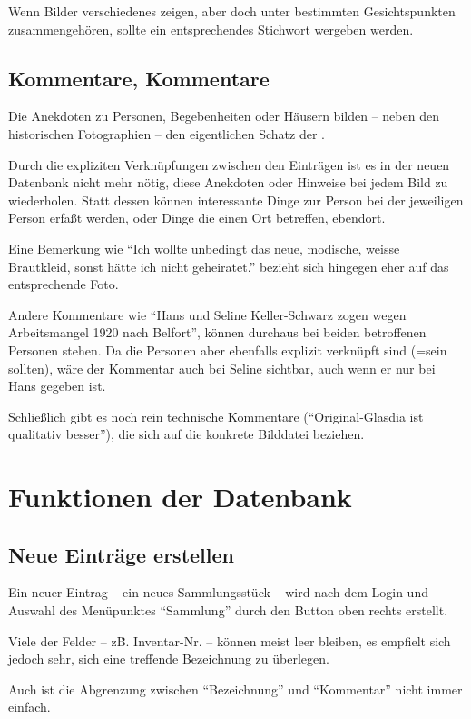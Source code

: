 \documentclass{scrartcl}
\begin{document}
Wenn Bilder verschiedenes zeigen, aber doch unter bestimmten
Gesichtspunkten zusammengehören, sollte ein entsprechendes Stichwort
wergeben werden.

\subsection{Kommentare, Kommentare}

Die Anekdoten zu Personen, Begebenheiten oder Häusern bilden -- neben
den historischen Fotographien -- den eigentlichen Schatz der \DB{}.

Durch die expliziten Verknüpfungen zwischen den Einträgen ist es
in der neuen Datenbank nicht mehr nötig, diese Anekdoten oder Hinweise
bei jedem Bild zu wiederholen. Statt dessen können interessante
Dinge zur Person bei der jeweiligen Person erfaßt werden, oder
Dinge die einen Ort betreffen, ebendort.

Eine Bemerkung wie ``Ich wollte unbedingt das neue, modische, weisse
Brautkleid, sonst hätte ich nicht geheiratet.'' bezieht sich hingegen
eher auf das entsprechende Foto.

Andere Kommentare wie ``Hans und Seline Keller-Schwarz zogen wegen
Arbeitsmangel 1920 nach Belfort'', können durchaus bei beiden
betroffenen Personen stehen. Da die Personen aber ebenfalls explizit
verknüpft sind (=sein sollten), wäre der Kommentar auch bei Seline
sichtbar, auch wenn er nur bei Hans gegeben ist.

Schließlich gibt es noch rein technische Kommentare
(``Original-Glasdia ist qualitativ besser''), die sich auf die
konkrete Bilddatei beziehen. 



\section{Funktionen der Datenbank}
\subsection{Neue Einträge erstellen}

Ein neuer Eintrag -- ein neues Sammlungsstück -- wird nach dem Login und
Auswahl des Menüpunktes ``Sammlung'' durch den Button 
oben rechts erstellt.

Viele der Felder -- z\.B. Inventar-Nr. -- können meist leer bleiben,
es empfielt sich jedoch sehr, sich eine treffende Bezeichnung zu überlegen.

Auch ist die Abgrenzung zwischen ``Bezeichnung'' und ``Kommentar''
nicht immer einfach.
\end{document}
